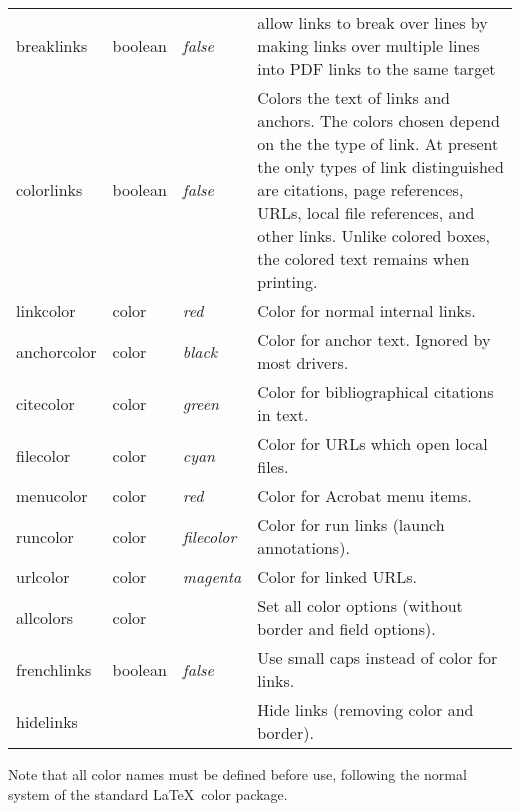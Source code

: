 \documentclass{article}
\newcommand*{\xpackage}[1]{\textsf{#1}}
\begin{document}
\begin{longtable}{@{}>{\ttfamily}ll>{\itshape}lp{8cm}@{}}
breaklinks     & boolean & false   & allow links to break over lines by making links over multiple lines into PDF links to
                                     the same target \\
colorlinks     & boolean & false   & Colors the text of links and anchors. The colors chosen depend on the the type of
                                     link. At present the only types of link distinguished are citations, page references,
                                     URLs, local file references, and other links.
                                     Unlike colored boxes, the colored
                                     text remains when printing.\\
linkcolor      & color   & red     & Color for normal internal links. \\
anchorcolor    & color   & black   & Color for anchor text. Ignored by most drivers. \\
citecolor      & color   & green   & Color for bibliographical citations in text. \\
filecolor      & color   & cyan    & Color for URLs which open local files. \\
menucolor      & color   & red     & Color for Acrobat menu items. \\
runcolor       & color   & filecolor & Color for run links (launch annotations). \\
urlcolor       & color   & magenta & Color for linked URLs. \\
allcolors      & color   &         & Set all color options (without border and field options).\\
frenchlinks    & boolean & false   & Use small caps instead of color for links.\\
hidelinks      &         &         & Hide links (removing color and border). \\
\end{longtable} \smallskip

Note that all color names must be defined before use, following the
normal system of the standard \LaTeX\ \xpackage{color} package.
\end{document}
